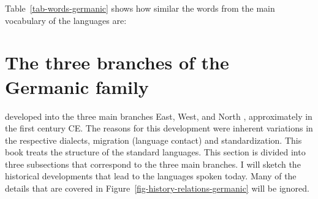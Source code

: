 \noindent
Table~\vref{tab-words-germanic} shows how similar the words from the main vocabulary of the 
languages are:
\begin{table}
\caption{\label{tab-words-germanic}Words from the main vocabulary of some Germanic languages}
\end{table}






\section{The three branches of the Germanic family}

 developed into the three main branches East, West, and North , approximately in
the first century CE. The reasons for this development were inherent variations in the respective
dialects, migration (language contact) and standardization. This book treats the structure of the
 standard languages. This section is divided into three subsections that correspond to the
three main  branches. I will sketch the historical developments that lead to the
languages spoken today. Many of the details that are covered in Figure~\ref{fig-history-relations-germanic} will be ignored.



